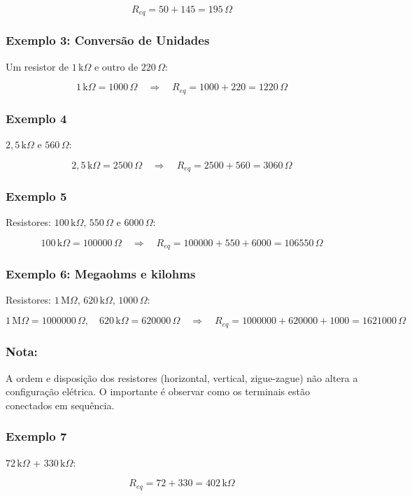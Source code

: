 \[
R_{eq} = 50 + 145 = 195\,\Omega
\]

\subsubsection{Exemplo 3: Conversão de Unidades}
Um resistor de $1\,\text{k}\Omega$ e outro de $220\,\Omega$:

\[
1\,\text{k}\Omega = 1000\,\Omega
\quad \Rightarrow \quad
R_{eq} = 1000 + 220 = 1220\,\Omega
\]

\subsubsection{Exemplo 4}
$2{,}5\,\text{k}\Omega$ e $560\,\Omega$:

\[
2{,}5\,\text{k}\Omega = 2500\,\Omega
\quad \Rightarrow \quad
R_{eq} = 2500 + 560 = 3060\,\Omega
\]

\subsubsection{Exemplo 5}
Resistores: $100\,\text{k}\Omega$, $550\,\Omega$ e $6000\,\Omega$:

\[
100\,\text{k}\Omega = 100000\,\Omega
\quad \Rightarrow \quad
R_{eq} = 100000 + 550 + 6000 = 106550\,\Omega
\]

\subsubsection{Exemplo 6: Megaohms e kilohms}
Resistores: $1\,\text{M}\Omega$, $620\,\text{k}\Omega$, $1000\,\Omega$:

\[
1\,\text{M}\Omega = 1000000\,\Omega,\quad
620\,\text{k}\Omega = 620000\,\Omega
\quad \Rightarrow \quad
R_{eq} = 1000000 + 620000 + 1000 = 1621000\,\Omega
\]

\subsubsection{Nota:}
A ordem e disposição dos resistores (horizontal, vertical, zigue-zague) não altera a configuração elétrica. O importante é observar como os terminais estão conectados em sequência.

\subsubsection{Exemplo 7}
$72\,\text{k}\Omega$ + $330\,\text{k}\Omega$:

\[
R_{eq} = 72 + 330 = 402\,\text{k}\Omega
\]

